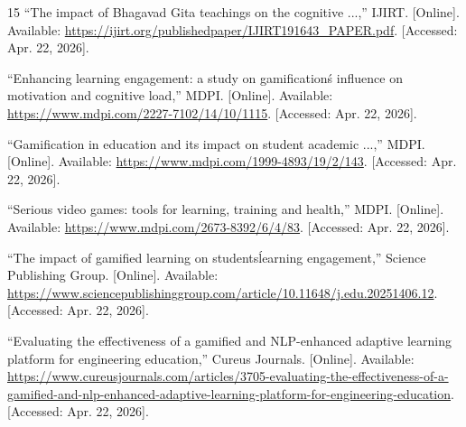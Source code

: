 \documentclass[conference]{IEEEtran}
\begin{document}
\begin{thebibliography}{15}
``The impact of Bhagavad Gita teachings on the cognitive ...,'' IJIRT. [Online]. Available: \url{https://ijirt.org/publishedpaper/IJIRT191643_PAPER.pdf}. [Accessed: Apr. 22, 2026].

``Enhancing learning engagement: a study on gamification\'s influence on motivation and cognitive load,'' MDPI. [Online]. Available: \url{https://www.mdpi.com/2227-7102/14/10/1115}. [Accessed: Apr. 22, 2026].

``Gamification in education and its impact on student academic ...,'' MDPI. [Online]. Available: \url{https://www.mdpi.com/1999-4893/19/2/143}. [Accessed: Apr. 22, 2026].

``Serious video games: tools for learning, training and health,'' MDPI. [Online]. Available: \url{https://www.mdpi.com/2673-8392/6/4/83}. [Accessed: Apr. 22, 2026].

``The impact of gamified learning on students\' learning engagement,'' Science Publishing Group. [Online]. Available: \url{https://www.sciencepublishinggroup.com/article/10.11648/j.edu.20251406.12}. [Accessed: Apr. 22, 2026].

``Evaluating the effectiveness of a gamified and NLP-enhanced adaptive learning platform for engineering education,'' Cureus Journals. [Online]. Available: \url{https://www.cureusjournals.com/articles/3705-evaluating-the-effectiveness-of-a-gamified-and-nlp-enhanced-adaptive-learning-platform-for-engineering-education}. [Accessed: Apr. 22, 2026].

\end{thebibliography}
\end{document}
